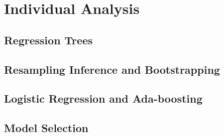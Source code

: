 \documentclass[11pt]{article}\usepackage[]{graphicx}\usepackage[]{color}
\begin{document}

\section{Individual Analysis}


\subsection{Regression Trees} %


\subsection{Resampling Inference and Bootstrapping} %


\subsection{Logistic Regression and Ada-boosting} %


\subsection{Model Selection} %
\end{document}

